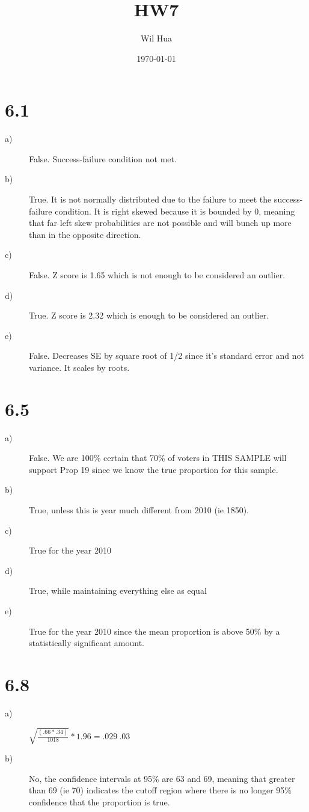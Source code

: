 \documentclass{article}
\title{\vspace*{-3em}HW7}
\author{Wil Hua}
\date{\today}
\begin{document}
\maketitle
\section*{6.1}
\begin{description}
    \item[a)] False. Success-failure condition not met. 
    \item[b)] True. It is not normally distributed due to the failure to meet 
        the success-failure condition. It is right skewed because it is bounded
        by 0, meaning that far left skew probabilities are not possible and will
        bunch up more than in the opposite direction.
    \item[c)] False. Z score is 1.65 which is not enough to be considered an outlier.
    \item[d)] True. Z score is 2.32 which is enough to be considered an outlier.
    \item[e)] False. Decreases SE by square root of 1/2 since it's standard error
        and not variance. It scales by roots. 
\end{description} 


\section*{6.5}
\begin{description}
    \item[a)] False. We are 100\% certain that 70\% of voters in THIS SAMPLE
        will support Prop 19 since we know the true proportion for this sample.
    \item[b)] True, unless this is year much different from 2010 (ie 1850).
    \item[c)] True for the year 2010
    \item[d)] True, while maintaining everything else as equal
    \item[e)] True for the year 2010 since the mean proportion is above 50\%
        by a statistically significant amount.
\end{description} 

\section*{6.8}
\begin{description}
    \item[a)] $\sqrt{\frac{(.66*.34)}{1018}} * 1.96 = .029 ~ .03$
    \item[b)] No, the confidence intervals at 95\% are 63 and 69, meaning
        that greater than 69 (ie 70) indicates the cutoff region where 
        there is no longer 95\% confidence that the proportion is true.
\end{description}
\end{document}
